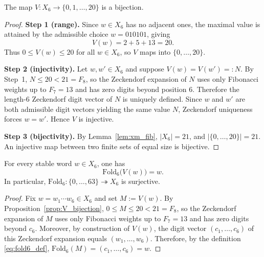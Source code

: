 \begin{proposition}\label{prop:V_bijection}
The map $V:X_6\to\{0,1,\dots,20\}$ is a bijection.
\end{proposition}
\begin{proof}
\textbf{Step 1 (range).}
Since $w\in X_6$ has no adjacent ones, the maximal value is attained by the
admissible choice $w=010101$, giving
\[
V(w)=2+5+13=20.
\]
Thus $0\le V(w)\le 20$ for all $w\in X_6$, so $V$ maps into $\{0,\ldots,20\}$.

\medskip
\noindent\textbf{Step 2 (injectivity).}
Let $w,w'\in X_6$ and suppose $V(w)=V(w')=:N$.
By Step~1, $N\le 20<21=F_8$, so the Zeckendorf expansion of $N$ uses only
Fibonacci weights up to $F_7=13$ and has zero digits beyond position $6$.
Therefore the length-$6$ Zeckendorf digit vector of $N$ is uniquely defined.
Since $w$ and $w'$ are both admissible digit vectors yielding the same value
$N$, Zeckendorf uniqueness forces $w=w'$.
Hence $V$ is injective.

\medskip
\noindent\textbf{Step 3 (bijectivity).}
By Lemma~\ref{lem:xm_fib}, $|X_6|=21$, and $|\{0,\ldots,20\}|=21$.
An injective map between two finite sets of equal size is bijective.
\end{proof}

\begin{lemma}\label{lem:fold6_surjective}
For every stable word $w\in X_6$, one has
\[
\mathrm{Fold}_6\!\bigl(V(w)\bigr)=w.
\]
In particular, $\mathrm{Fold}_6:\{0,\dots,63\}\twoheadrightarrow X_6$ is surjective.
\end{lemma}
\begin{proof}
Fix $w=w_1\cdots w_6\in X_6$ and set $M:=V(w)$.
By Proposition~\ref{prop:V_bijection}, $0\le M\le 20<21=F_8$, so the Zeckendorf expansion of $M$ uses only Fibonacci weights up to $F_7=13$ and has zero digits beyond $c_6$.
Moreover, by construction of $V(w)$, the digit vector $(c_1,\dots,c_6)$ of this Zeckendorf expansion equals $(w_1,\dots,w_6)$.
Therefore, by the definition \eqref{eq:fold6_def}, $\mathrm{Fold}_6(M)=(c_1,\dots,c_6)=w$.
\end{proof}

